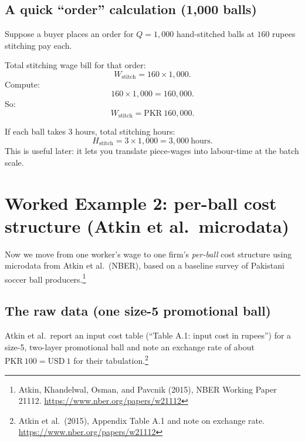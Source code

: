 \documentclass[11pt]{article}
\newcommand{\PKR}{\text{PKR}}
\newcommand{\USD}{\text{USD}}
\begin{document}
\subsection{A quick ``order'' calculation (1,000 balls)}
Suppose a buyer places an order for \(Q=1{,}000\) hand-stitched balls at \(160\) rupees stitching pay each.

Total stitching wage bill for that order:
\[
  W_{\text{stitch}} = 160\times 1{,}000.
\]
Compute:
\[
  160\times 1{,}000 = 160{,}000.
\]
So:
\[
  W_{\text{stitch}}=\PKR{}~160{,}000.
\]

If each ball takes \(3\) hours, total stitching hours:
\[
  H_{\text{stitch}} = 3\times 1{,}000 = 3{,}000~\text{hours}.
\]
This is useful later: it lets you translate piece-wages into labour-time at the batch scale.

\section{Worked Example 2: per-ball cost structure (Atkin et al.\ microdata)}

Now we move from one worker’s wage to one firm’s \emph{per-ball} cost structure using microdata
from Atkin et al.\ (NBER), based on a baseline survey of Pakistani soccer ball producers.\footnote{Atkin, Khandelwal, Osman, and Pavcnik (2015), NBER Working Paper 21112. \url{https://www.nber.org/papers/w21112}}

\subsection{The raw data (one size-5 promotional ball)}
Atkin et al.\ report an input cost table (``Table A.1: input cost in rupees'') for a size-5, two-layer promotional ball
and note an exchange rate of about \(\PKR{}~100=\USD{}~1\) for their tabulation.\footnote{Atkin et al.\ (2015), Appendix Table A.1 and note on exchange rate. \url{https://www.nber.org/papers/w21112}}
\end{document}
